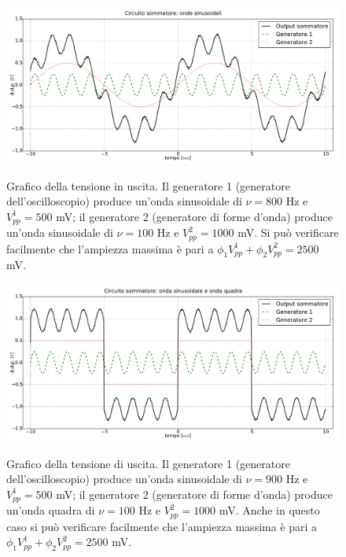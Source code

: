 \begin{figure}[ht]
 \centering
   {\includegraphics[width=16.5cm]{../E01/latex/sinsin.pdf}}
 \caption{Grafico della tensione in uscita. Il generatore 1 (generatore dell'oscilloscopio) produce un'onda sinusoidale di $\nu=800$ \si{\hertz} e $V^1_{pp}=500$ \si{\milli\volt}; il generatore 2 (generatore di forme d'onda) produce un'onda sinusoidale di $\nu=100$ \si{\hertz} e $V^2_{pp}=1000$ \si{\milli\volt}. Si può verificare facilmente che l'ampiezza massima è pari a $\phi_1 V^1_{pp}+\phi_2 V^2_{pp}=2500$ \si{\milli\volt}.}
 \label{gr:onde1}
\end{figure}

\begin{figure}[ht]
 \centering
   {\includegraphics[width=16.5cm]{../E01/latex/sinquad.pdf}}
 \caption{Grafico della tensione di uscita. Il generatore 1 (generatore dell'oscilloscopio) produce un'onda sinusoidale di $\nu=900$ \si{\hertz} e $V^1_{pp}=500$ \si{\milli\volt}; il generatore 2 (generatore di forme d'onda) produce un'onda quadra di $\nu=100$ \si{\hertz} e $V^2_{pp}=1000$ \si{\milli\volt}. Anche in questo caso si può verificare facilmente che l'ampiezza massima è pari a $\phi_1 V^1_{pp}+\phi_2 V^2_{pp}=2500$ \si{\milli\volt}.}
 \label{gr:onde2}
\end{figure}